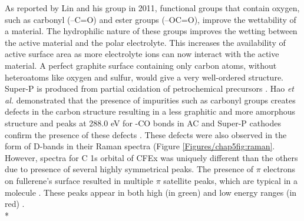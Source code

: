 As reported by Lin and his group in 2011, functional groups that contain oxygen, such as carbonyl (--C=O) and ester groups (--OC=O), improve the wettability of a material. The hydrophilic nature of these groups improves the wetting between the active material and the polar electrolyte.  This increases the availability of active surface area as more electrolyte ions can now interact with the active material\cite{younesi_analysis_2015}. A perfect graphite surface containing only carbon atoms, without heteroatoms like oxygen and sulfur, would give a very well-ordered structure. Super-P is produced from partial oxidation of petrochemical precursors \cite{gnanamuthu_electrochemical_2011}. Hao \textit{et al.} demonstrated that the presence of impurities such as carbonyl groups creates defects in the carbon structure resulting in a less graphitic and more amorphous structure and peaks at 288.0 eV for -CO bonds in AC and Super-P cathodes confirm the presence of these defects \cite{hao_carbonaceous_2013}. These defects were also observed in the form of D-bands in their Raman spectra (Figure \ref{Figures/chap5fig:raman}. However, spectra for C 1s orbital of CFEx was uniquely different than the others due to presence of several highly symmetrical peaks. The presence of $\pi$ electrons on fullerene's surface resulted in  multiple $\pi$ satellite peaks, which are typical in a  molecule \cite{skryleva_xps_2016}. These peaks appear in both high (in green) and low energy ranges (in red) \cite{erbahar_spectromicroscopy_2016, poirier_carbon_1993}.\\*

